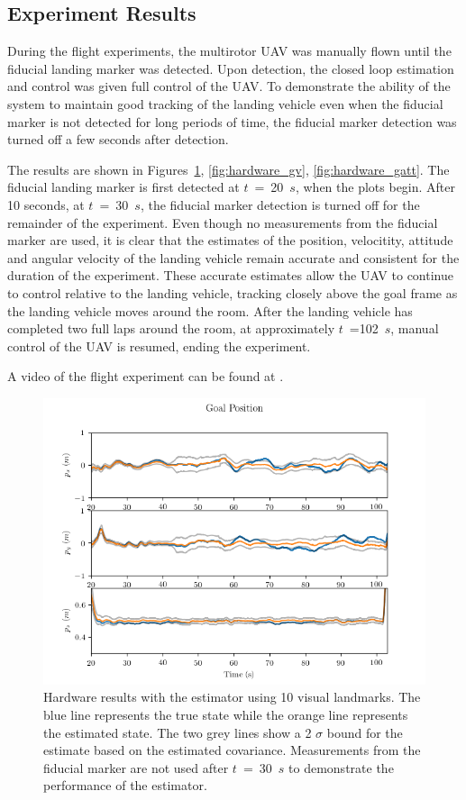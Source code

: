 
\subsection{Experiment Results}
During the flight experiments, the multirotor UAV was manually flown until the
fiducial landing marker was detected. Upon detection, the closed loop estimation
and control was given full control of the UAV. To demonstrate the ability of the
system to maintain good tracking of the landing vehicle even when the fiducial
marker is not detected for long periods of time, the fiducial marker detection
was turned off a few seconds after detection.

The results are shown in Figures~\ref{fig:hardware_gp}, \ref{fig:hardware_gv},
\ref{fig:hardware_gatt}. The fiducial landing marker is first detected at
$t$~=~20~$s$, when the plots begin. After 10 seconds, at $t$~=~30~$s$, the
fiducial marker detection is turned off for the remainder of the experiment.
Even though no measurements from the fiducial marker are used, it is clear that
the estimates of the position, velocitity, attitude and angular velocity of the
landing vehicle remain accurate and consistent for the duration of the
experiment. These accurate estimates allow
the UAV to continue to control relative to the landing vehicle, tracking closely
above the goal frame as the landing vehicle moves around the room. After the
landing vehicle has completed two full laps around the room,
at approximately $t$~=102~$s$, manual control of the UAV is resumed, ending the experiment.

A video of the flight experiment can be found at .

\begin{figure}
  \centering
  \includegraphics[scale=0.5]{plots/hardware_gp.png}
  \caption{Hardware results with the estimator using 10 visual
  landmarks. The blue line represents the true state while the orange line
  represents the estimated state. The two grey lines show a 2 $\sigma$ bound for
  the estimate based on the estimated covariance. Measurements from the fiducial
  marker are not used after $t$~=~30~$s$ to demonstrate the performance of the estimator.}
  \label{fig:hardware_gp}
\end{figure}

